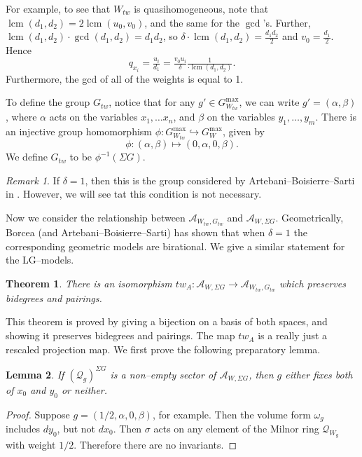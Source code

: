 \documentclass[10pt, letterpaper]{amsart}
\newtheorem{thm}{Theorem}%
\newtheorem{lem}[thm]{Lemma}
\theoremstyle{remark}
\newtheorem{rem}{Remark}[thm]
\newcommand{\sA}{\mathscr{A}}
\newcommand{\sQ}{\mathscr{Q}}
\newcommand{\tw}[1]{{#1}_{tw}}
\newcommand{\s}[1]{\Sigma #1}
\DeclareMathOperator{\lcm}{lcm}
\begin{document}
For example, to see that $\tw{W}$ is quasihomogeneous, note that $\lcm(d_1,d_2)=2\lcm(u_0,v_0)$, and the same for the $\gcd$'s. Further,  $\lcm(d_1,d_2)\cdot\gcd(d_1,d_2)=d_1d_2$, so  $\delta\cdot\lcm(d_1,d_2)=\tfrac{d_1d_2}{2}$ and $v_0=\tfrac{d_1}{2}$. Hence
\[
q_{x_i}=\tfrac{u_i}{d_1}=\tfrac{v_0u_i}{\delta}\tfrac{1}{\cdot\lcm(d_1,d_2)}.
\]
Furthermore, the gcd of all of the weights is equal to 1. 


To define the group $\tw G$, notice that for any $g'\in G^{\max}_{\tw{W}}$,
we can write $g'=(\alpha, \beta)$, where $\alpha$ acts on the variables $x_1, \ldots x_n$, and $\beta$ on the variables $y_1, \ldots, y_m$. There is an injective group homomorphism $\phi:G_{\tw{W}}^{\max}\hookrightarrow G_{W}^{\max}$, given by 
\[
\phi: (\alpha,\beta)\mapsto (0,\alpha, 0, \beta). 
\]
We define $\tw{G}$ to be $\phi^{-1}(\s{G})$. \\

\begin{rem} If $\delta=1$, then this is the group considered by Artebani--Boisierre--Sarti in \cite{ABS}. However, we will see tat this condition is not necessary. 
\end{rem}

Now we consider the relationship between $\sA_{\tw{W},\tw{G}}$ and $\sA_{W,\s{G}}$. Geometrically, Borcea (and Artebani--Boisierre--Sarti) has shown that when $\delta=1$ the corresponding geometric models are birational. We give a similar statement for the LG--models. 

\begin{thm}\label{t:twist}
There is an isomorphism $tw_A:\sA_{W,\s{G}}\to \sA_{ \tw{W}, \tw{G}}$ which preserves bidegrees and pairings. 
\end{thm}

This theorem is proved by giving a bijection on a basis of both spaces, and showing it preserves bidegrees and pairings. The map $tw_A$ is a really just a rescaled projection map. We first prove the following preparatory lemma. 

\begin{lem}\label{l:allornothing}
If $(\sQ_{g})^{\s{G}}$ is a non--empty sector of $\sA_{W,\s{G}}$, then $g$ either fixes both of $x_0$ and $y_0$ or neither. 
\end{lem}
\begin{proof}
Suppose $g=(1/2,\alpha, 0,\beta)$, for example. Then the volume form $\omega_g$ includes $dy_0$, but not $dx_0$. Then $\sigma$ acts on any element of the Milnor ring $\sQ_{W_g}$ with weight $1/2$. Therefore there are no invariants. 
\end{proof}
\end{document}
